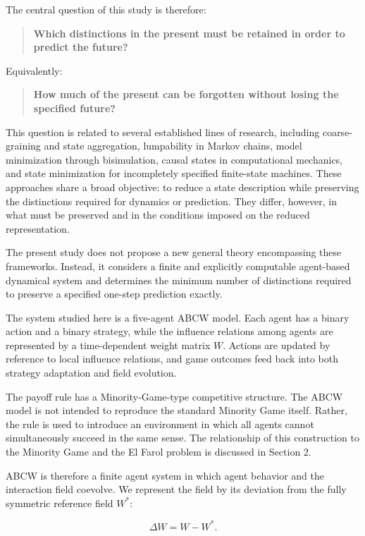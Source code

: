\documentclass[
  11pt,
]{article}
\begin{document}
The central question of this study is therefore:

\begin{quote}
\textbf{Which distinctions in the present must be retained in order to
predict the future?}
\end{quote}

Equivalently:

\begin{quote}
\textbf{How much of the present can be forgotten without losing the
specified future?}
\end{quote}

This question is related to several established lines of research,
including coarse-graining and state aggregation, lumpability in Markov
chains, model minimization through bisimulation, causal states in
computational mechanics, and state minimization for incompletely
specified finite-state machines. These approaches share a broad
objective: to reduce a state description while preserving the
distinctions required for dynamics or prediction. They differ, however,
in what must be preserved and in the conditions imposed on the reduced
representation.

The present study does not propose a new general theory encompassing
these frameworks. Instead, it considers a finite and explicitly
computable agent-based dynamical system and determines the minimum
number of distinctions required to preserve a specified one-step
prediction exactly.

The system studied here is a five-agent ABCW model. Each agent has a
binary action and a binary strategy, while the influence relations among
agents are represented by a time-dependent weight matrix \({W}\).
Actions are updated by reference to local influence relations, and game
outcomes feed back into both strategy adaptation and field evolution.

The payoff rule has a Minority-Game-type competitive structure. The ABCW
model is not intended to reproduce the standard Minority Game itself.
Rather, the rule is used to introduce an environment in which all agents
cannot simultaneously succeed in the same sense. The relationship of
this construction to the Minority Game and the El Farol problem is
discussed in Section 2.

ABCW is therefore a finite agent system in which agent behavior and the
interaction field coevolve. We represent the field by its deviation from
the fully symmetric reference field \({W^\ast}\):

\[{\Delta W=W-W^\ast.}\]
\end{document}
